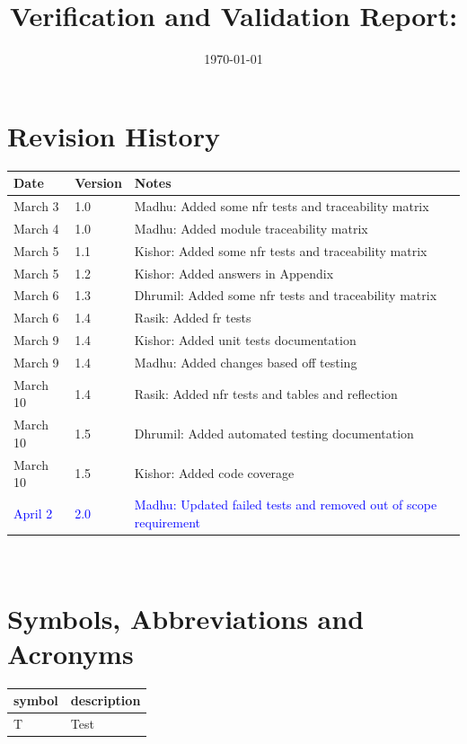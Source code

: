\documentclass[12pt, titlepage]{article}
\begin{document}
\title{Verification and Validation Report: \progname} 
\author{\authname}
\date{\today}
	
\maketitle


\section{Revision History}

\begin{tabularx}{\textwidth}{p{3cm}p{2cm}X}
\toprule {\bf Date} & {\bf Version} & {\bf Notes}\\
\midrule
March 3 & 1.0 & Madhu: Added some nfr tests and traceability matrix\\
March 4 & 1.0 & Madhu: Added module traceability matrix\\
March 5 & 1.1 & Kishor: Added some nfr tests and traceability matrix\\
March 5 & 1.2 & Kishor: Added answers in Appendix\\
March 6 & 1.3 & Dhrumil: Added some nfr tests and traceability matrix\\
March 6 & 1.4 & Rasik: Added fr tests \\
March 9 & 1.4 & Kishor: Added unit tests documentation\\
March 9 & 1.4 & Madhu: Added changes based off testing\\
March 10 & 1.4 & Rasik: Added nfr tests and tables and reflection\\
March 10 & 1.5 & Dhrumil: Added automated testing documentation\\
March 10 & 1.5 & Kishor: Added code coverage\\
\textcolor{blue}{April 2} & \textcolor{blue}{2.0} & \textcolor{blue}{Madhu: Updated failed tests and removed out of scope requirement}\\



\bottomrule
\end{tabularx}

~\newpage

\section{Symbols, Abbreviations and Acronyms}

\renewcommand{\arraystretch}{1.2}
\begin{tabular}{l l} 
  \toprule		
  \textbf{symbol} & \textbf{description}\\
  \midrule 
  T & Test\\
  \bottomrule
\end{tabular}\\
\end{document}

